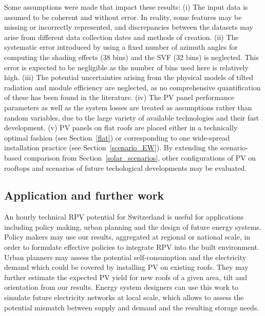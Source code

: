 Some assumptions were made that impact these results:
(i) The input data is assumed to be coherent and without error. In reality, some features may be missing or incorrectly represented, and discrepancies between the datasets may arise from  different data collection dates and methods of creation.
(ii) The systematic error introduced by using a fixed number of azimuth angles for computing the shading effects (38 bins) and the SVF (32 bins) is neglected. This error is expected to be negligible as the number of bins used here is relatively high.
(iii) The potential uncertainties arising from the physical models of tilted radiation and module efficiency are neglected, as no comprehensive quantification of these has been found in the literature.
(iv) The PV panel performance parameters as well as the system losses are treated as assumptions rather than random variables, due to the large variety of available technologies and their fast development. 
(v) PV panels on flat roofs are placed either in a technically optimal fashion (see Section~\ref{flat}) or corresponding to one wide-spread installation practice (see Section~\ref{scenario_EW}).
By extending the scenario-based comparison from Section~\ref{solar_scenarios}, other configurations of PV on rooftops and scenarios of future techological developments may be evaluated.


\subsection{Application and further work}
\label{application_pv}
An hourly technical RPV potential for Switzerland is useful for applications including policy making, urban planning and the design of future energy systems. 
Policy makers may use our results, aggregated at regional or national scale, in order to  formulate effective policies to integrate RPV into the built environment. 
Urban planners may assess the potential self-consumption and the electricity demand which could be covered by installing PV on existing roofs. They may further estimate the expected PV yield for new roofs of a given area, tilt and orientation from our results.
Energy system designers can use this work to simulate future electricity networks at local scale, which allows to assess the potential mismatch between supply and demand and the resulting storage needs. 

